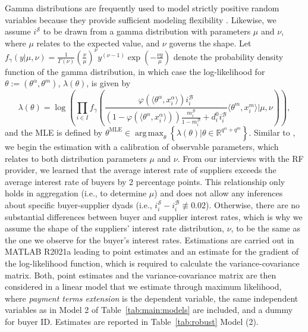 \documentclass[A4,11pt]{article}
\newcommand{\bx}{\mathcal B}
\newcommand{\sx}{\mathcal S}
\newcommand{\mm}{\mu}
\newcommand{\vv}{\nu}
\newcommand{\IS}{i^{\sx}}
\renewcommand{\~}[1]{\tilde{#1}}
\renewcommand{\-}[1]{\overline{#1}}
\DeclareMathOperator*{\argmax}{arg\,max}
\begin{document}
\begin{appendices}
Gamma distributions are frequently used to model strictly positive random variables \citep{Eliason1993} because they provide sufficient modeling flexibility \citep{Millar2011}. Likewise, we assume $\IS$ to be drawn from a gamma distribution with parameters $\mm$ and $\vv$, where $\mm$ relates to the expected value, and $\vv$ governs the shape. Let $f_\gamma\left(y | \mm,\vv\right)=\frac{1}{\Gamma(\vv)}\left(\frac{\vv}{\mm}\right)^\vv y^{(\vv-1)}\exp\left(-\frac{\vv y}{\mm}\right)$ denote the probability density function of the gamma distribution, in which case the log-likelihood for $\theta:=\left(\theta^\alpha,\theta^m\right)$, $\lambda\left(\theta\right)$, is given by
\begin{equation}
\lambda\left(\theta\right) = \log\left(\prod_{i\in I} f_\gamma\left(\frac{\varphi\left(\langle \theta^\alpha,x^\alpha_i\rangle\right)i^\bx_i}{\left(1-\varphi\left(\langle \theta^\alpha,x^\alpha_i\rangle\right)\right)\frac{m^\bx_i}{1-m^\bx_i}+d_i^0i_i^\bx}\langle \theta^m,x^m_i\rangle \Bigg| \mm,\vv\right)\right),
\end{equation}
and the MLE is defined by $\theta^{\text{MLE}} \in \argmax_{\theta}\left\{\lambda\left(\theta\right)|\theta\in\mathbb R^{q^\alpha+q^m}\right\}$. Similar to \citet{Tunca2017}, we begin the estimation with a calibration of observable parameters, which relates to both distribution parameters $\mm$ and $\vv$. From our interviews with the RF provider, we learned that the average interest rate of suppliers exceeds the average interest rate of buyers by 2 percentage points. This relationship only holds in aggregation (i.e., to determine $\mm$) and does not allow any inferences about specific buyer-supplier dyads (i.e., $i^\sx_i-i^\bx_i\not\equiv 0.02$). Otherwise, there are no substantial differences between buyer and supplier interest rates, which is why we assume the shape of the suppliers' interest rate distribution, $\vv$, to be the same as the one we observe for the buyer's interest rates. Estimations are carried out in MATLAB R2021a leading to point estimates and an estimate for the gradient of the log-likelihood function, which is required to calculate the variance-covariance matrix. Both, point estimates and the variance-covariance matrix are then considered in a linear model that we estimate through maximum likelihood, where \textit{payment terms extension} is the dependent variable, the same independent variables as in Model 2 of Table~\ref{tab:main:models} are included, and a dummy for buyer ID. Estimates are reported in Table~\ref{tab:robust} Model (2).


\end{appendices}
\end{document}
